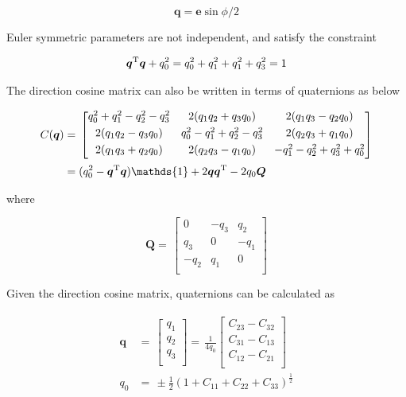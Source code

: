 \begin{equation}
\label{eqn:quat3}
\bm{q} = \bm{e}\sin{\phi/2}
\end{equation}

Euler symmetric parameters are not independent, and satisfy the constraint

\begin{equation}
\label{eqn:quatNormConstraint}
\bm{q}^{\rm T} \bm{q} + q_0^2 = q_0^2 + q_1^2 +q_1^2 +q_3^2 = 1
\end{equation}

The direction cosine matrix can also be written in terms of quaternions as below

\begin{align}\label{eqn:Cquat}
\begin{split}
C(\bm{q})
 & =\,
\begin{bmatrix}
q_0^2 + q_1^2 - q_2^2 - q_3^2 & 2(q_1 q_2 + q_3 q_0) & 2(q_1 q_3 - q_2 q_0)\\[0.3em]
2(q_1 q_2 - q_3 q_0) & q_0^2 - q_1^2 + q_2^2 - q_3^2 & 2(q_2 q_3 + q_1 q_0)\\[0.3em]
2(q_1 q_3 + q_2 q_0) & 2(q_2 q_3 - q_1 q_0) & -q_1^2 - q_2^2 + q_3^2 + q_0^2\\[0.3em]
\end{bmatrix}
\\
& = (q_0^2 - \bm{q}^{\rm T}\bm{q} )\mathds{1} + 2\bm{q}\bm{q}^{\rm T} - 2q_0\bm{Q}
\end{split}
\end{align}
 
where

\begin{equation}
\label{eqn:Qmatrix}
\bm{Q}
=\,
\begin{bmatrix}
0 & - q_3 & q_2 \\[0.3em]
q_3 & 0 & - q_1 \\[0.3em]
- q_2 & q_1 & 0\\[0.3em]
\end{bmatrix}
\end{equation}

Given the direction cosine matrix, quaternions can be calculated as

\begin{align}\label{eqn:quat4}
\begin{split}
\bm{q}
& =\,
\begin{bmatrix}
q_1\\[0.3em]
q_2\\[0.3em]
q_3\\[0.3em]
\end{bmatrix}
 =\,
\frac{1}{4q_0}
\begin{bmatrix}
C_{23} - C_{32}\\[0.3em]
C_{31} - C_{13}\\[0.3em]
C_{12} - C_{21}\\[0.3em]
\end{bmatrix}
\\
q_0
& =\,
\pm{\frac{1}{2}}{(1 + C_{11} + C_{22} + C_{33})}^{\frac{1}{2}}
\end{split}
\end{align}

